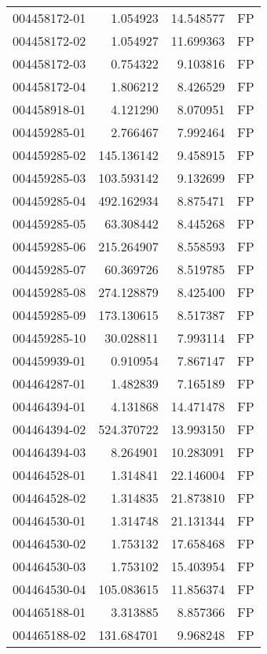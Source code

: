 \begin{tabular}{lrrl}
004458172-01 &    1.054923 &      14.548577 &   FP \\
004458172-02 &    1.054927 &      11.699363 &   FP \\
004458172-03 &    0.754322 &       9.103816 &   FP \\
004458172-04 &    1.806212 &       8.426529 &   FP \\
004458918-01 &    4.121290 &       8.070951 &   FP \\
004459285-01 &    2.766467 &       7.992464 &   FP \\
004459285-02 &  145.136142 &       9.458915 &   FP \\
004459285-03 &  103.593142 &       9.132699 &   FP \\
004459285-04 &  492.162934 &       8.875471 &   FP \\
004459285-05 &   63.308442 &       8.445268 &   FP \\
004459285-06 &  215.264907 &       8.558593 &   FP \\
004459285-07 &   60.369726 &       8.519785 &   FP \\
004459285-08 &  274.128879 &       8.425400 &   FP \\
004459285-09 &  173.130615 &       8.517387 &   FP \\
004459285-10 &   30.028811 &       7.993114 &   FP \\
004459939-01 &    0.910954 &       7.867147 &   FP \\
004464287-01 &    1.482839 &       7.165189 &   FP \\
004464394-01 &    4.131868 &      14.471478 &   FP \\
004464394-02 &  524.370722 &      13.993150 &   FP \\
004464394-03 &    8.264901 &      10.283091 &   FP \\
004464528-01 &    1.314841 &      22.146004 &   FP \\
004464528-02 &    1.314835 &      21.873810 &   FP \\
004464530-01 &    1.314748 &      21.131344 &   FP \\
004464530-02 &    1.753132 &      17.658468 &   FP \\
004464530-03 &    1.753102 &      15.403954 &   FP \\
004464530-04 &  105.083615 &      11.856374 &   FP \\
004465188-01 &    3.313885 &       8.857366 &   FP \\
004465188-02 &  131.684701 &       9.968248 &   FP \\

\end{tabular}
